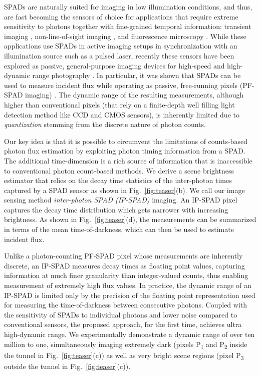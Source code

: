 \smallskip {} SPADs are
naturally suited for imaging in low illumination conditions, and thus, are fast
becoming the sensors of choice for applications that require extreme
sensitivity to photons together with fine-grained temporal information:
transient imaging \cite{Ulku_2019,turpin2020spatial}, non-line-of-sight imaging
\cite{liu2019non,grau2020deep}, and fluorescence microscopy
\cite{perenzoni2015160}. While these applications use SPADs in active imaging
setups in synchronization with an illumination source such as a pulsed
laser, recently these sensors have been explored as passive, general-purpose
imaging devices for high-speed and high-dynamic range photography
\cite{Antolovic_2018,ingle2019high,ma2020quanta}.  In particular, it was shown
that SPADs can be used to measure incident flux while operating as passive,
free-running pixels (PF-SPAD imaging) \cite{ingle2019high}. The dynamic range
of the resulting measurements, although higher than conventional pixels (that
rely on a finite-depth well filling light detection method like CCD and CMOS
sensors), is inherently limited due to \emph{quantization} stemming from the
discrete nature of photon counts.

\smallskip
{} Our key idea is that
it is possible to circumvent the limitations of counts-based photon flux
estimation by exploiting photon timing information from a SPAD. The
additional time-dimension is a rich source of information that is
inaccessible to conventional photon count-based methods. We derive a scene
brightness estimator that relies on the decay time statistics of the
inter-photon times captured by a SPAD sensor as shown in
Fig.~\ref{fig:teaser}(b).  We call our image sensing method
\emph{inter-photon SPAD (IP-SPAD)} imaging. An IP-SPAD pixel captures the
decay time distribution which gets narrower with increasing brightness. As
shown in Fig.~\ref{fig:teaser}(d), the measurements can be summarized in
terms of the mean time-of-darkness, which can then be used to estimate
incident flux. 

Unlike a photon-counting PF-SPAD pixel whose measurements are inherently
discrete, an IP-SPAD measures decay times as floating point values, capturing
information at much finer granularity than integer-valued counts, thus enabling
measurement of extremely high flux values. In practice, the dynamic range of an
IP-SPAD is limited only by the precision of the floating point representation
used for measuring the time-of-darkness between consecutive photons. Coupled
with the sensitivity of SPADs to individual photons and lower noise compared to
conventional sensors, the proposed approach, for the first time, achieves ultra
high-dynamic range. We experimentally demonstrate a dynamic range of over ten
million to one, simultaneously imaging extremely dark (pixels
P\textsubscript{1} and P\textsubscript{2} inside the tunnel in
Fig.~\ref{fig:teaser}(c)) as well as very bright scene regions (pixel
P\textsubscript{3} outside the tunnel in Fig.~\ref{fig:teaser}(c)). 

